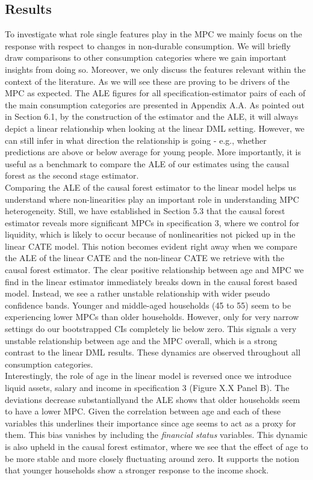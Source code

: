 \subsection{Results} 
To investigate what role single features play in the MPC we mainly focus on the response with respect to changes in non-durable consumption. We will briefly draw comparisons to other consumption categories where we gain important insights from doing so. Moreover, we only discuss the features relevant within the context of the literature. As we will see these are proving to be drivers of the MPC as expected. The ALE figures for all specification-estimator pairs of each of the main consumption categories are presented in Appendix A.A. As pointed out in Section 6.1, by the construction of the estimator and the ALE, it will always depict a linear relationship when looking at the linear DML setting. However, we can still infer in what direction the relationship is going - e.g., whether predictions are above or below average for young people. More importantly, it is useful as a benchmark to compare the ALE of our estimates using the causal forest as the second stage estimator. \\
Comparing the ALE of the causal forest estimator to the linear model helps us understand where non-linearities play an important role in understanding MPC heterogeneity. Still, we have established in Section 5.3 that the causal forest estimator reveals more significant MPCs in specification 3, where we control for liquidity, which is likely to occur because of nonlinearities not picked up in the linear CATE model. This notion becomes evident right away when we compare the ALE of the linear CATE and the non-linear CATE we retrieve with the causal forest estimator. The clear positive relationship between age and MPC we find in the linear estimator immediately breaks down in the causal forest based model. Instead, we see a rather unstable relationship with wider pseudo confidence bands. Younger and middle-aged households (45 to 55) seem to be experiencing lower MPCs than older households. However, only for very narrow settings do our bootstrapped CIs completely lie below zero. This signals a very unstable relationship between age and the MPC overall, which is a strong contrast to the linear DML results. These dynamics are observed throughout all consumption categories. \\
Interestingly, the role of age in the linear model is reversed once we introduce liquid assets, salary and income in specification 3 (Figure X.X Panel B). The deviations decrease substantiallyand the ALE shows that older households seem to have a lower MPC. Given the correlation between age and each of these variables this underlines their importance since age seems to act as a proxy for them. This bias vanishes by including the \textit{financial status} variables. This dynamic is also upheld in the causal forest estimator, where we see that the effect of age to be more stable and more closely fluctuating around zero. It supports the notion that younger households show a stronger response to the income shock. \\
